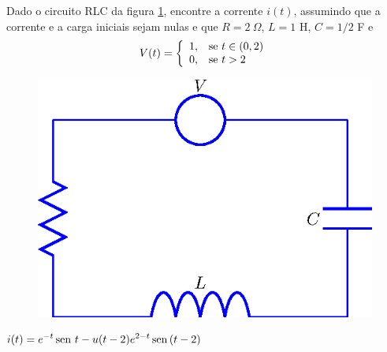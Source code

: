 \begin{exer}
Dado o circuito RLC da figura \ref{circ_3}, encontre a corrente $i(t)$, assumindo que a corrente e a carga iniciais sejam nulas e que $R= 2 \ \Omega$, $L = 1$ H, $C = 1/2$ F e 
\begin{equation}
V(t) = \left\{
                                               \begin{array}{ll}
                                                 1, & \hbox{se } t\in (0,2) \\
                                                 0, & \hbox{se } t>2
                                               \end{array}
                                             \right.
\end{equation}
\begin{figure}[!ht]
\begin{center}

\includegraphics{cap_dirac_conv/pics/figura_16}\end{center}
\caption{\label{circ_3}}
\end{figure} 
\end{exer}
\begin{resp}
 $\displaystyle i(t) = e^{-t}\operatorname{sen}\, t - u(t-2)  e^{2-t} \operatorname{sen}\, (t-2)$
\end{resp}
